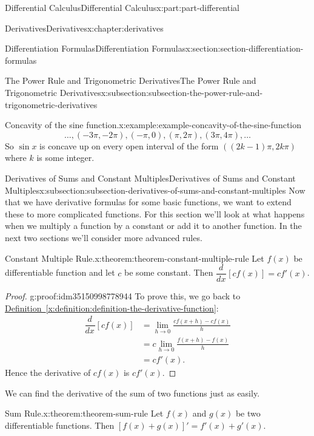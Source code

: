 \documentclass[twoside,10pt,]{book}
\newcommand{\xreffont}{\relax}
\numberwithin{equation}{part}
\newcommand{\dv}[3][]{\dfrac{d^{#1} #2}{d #3^{#1}}}
\begin{document}
\begin{partptx}{Differential Calculus}{}{Differential Calculus}{}{}{x:part:part-differential}
\begin{chapterptx}{Derivatives}{}{Derivatives}{}{}{x:chapter:derivatives}
\begin{sectionptx}{Differentiation Formulas}{}{Differentiation Formulas}{}{}{x:section:section-differentiation-formulas}
\begin{subsectionptx}{The Power Rule and Trigonometric Derivatives}{}{The Power Rule and Trigonometric Derivatives}{}{}{x:subsection:subsection-the-power-rule-and-trigonometric-derivatives}
\begin{example}{Concavity of the sine function.}{x:example:example-concavity-of-the-sine-function}
\begin{equation*}
\ldots, (-3\pi,-2\pi), (-\pi,0),(\pi,2\pi), (3\pi,4\pi),\ldots
\end{equation*}
So \(\sin x\) is concave up on every open interval of the form \(((2k-1)\pi, 2k\pi)\) where \(k\) is some integer.%
\end{example}
\end{subsectionptx}
%
%
\typeout{************************************************}
\typeout{************************************************}
%
\begin{subsectionptx}{Derivatives of Sums and Constant Multiples}{}{Derivatives of Sums and Constant Multiples}{}{}{x:subsection:subsection-derivatives-of-sums-and-constant-multiples}
Now that we have derivative formulas for some basic functions, we want to extend these to more complicated functions. For this section we'll look at what happens when we multiply a function by a constant or add it to another function. In the next two sections we'll consider more advanced rules.%
\begin{theorem}{Constant Multiple Rule.}{}{x:theorem:theorem-constant-multiple-rule}%
%
Let \(f(x)\) be differentiable function and let \(c\) be some constant. Then \(\dv{}{x}[cf(x)] = cf'(x)\).%
\end{theorem}
\begin{proof}{}{g:proof:idm35150998778944}
To prove this, we go back to \hyperref[x:definition:definition-the-derivative-function]{Definition~{\xreffont\ref{x:definition:definition-the-derivative-function}}}:%
\begin{align*}
\dv{}{x}[cf(x)] & = \lim_{h\to0}\frac{cf(x+h) - cf(x)}{h} \\
& = c\lim_{h\to0}\frac{f(x+h) - f(x)}{h} \\
& = cf'(x). 
\end{align*}
Hence the derivative of \(cf(x)\) is \(cf'(x)\).%
\end{proof}
We can find the derivative of the sum of two functions just as easily.%
\begin{theorem}{Sum Rule.}{}{x:theorem:theorem-sum-rule}%
%
Let \(f(x)\) and \(g(x)\) be two differentiable functions. Then \([f(x)+g(x)]' = f'(x) + g'(x)\).%
\end{theorem}
\end{subsectionptx}
\end{sectionptx}
%
%
\typeout{************************************************}

\end{chapterptx}
\end{partptx}
\end{document}
